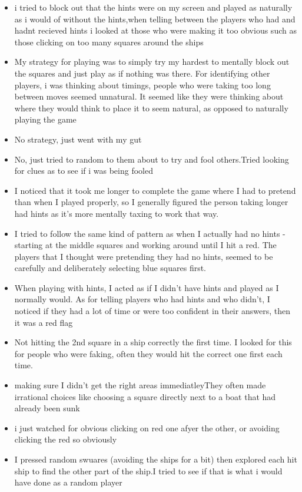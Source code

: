 \documentclass[
  english,
  man]{apa6}
\begin{document}
\begin{itemize}
\item
  i tried to block out that the hints were on my screen and played as naturally as i would of without the hints,when telling between the players who had and hadnt recieved hints i looked at those who were making it too obvious such as those clicking on too many squares around the ships
\item
  My strategy for playing was to simply try my hardest to mentally block out the squares and just play as if nothing was there. For identifying other players, i was thinking about timings, people who were taking too long between moves seemed unnatural. It seemed like they were thinking about where they would think to place it to seem natural, as opposed to naturally playing the game
\item
  No strategy, just went with my gut
\item
  No, just tried to random to them about to try and fool others.Tried looking for clues as to see if i was being fooled
\item
  I noticed that it took me longer to complete the game where I had to pretend than when I played properly, so I generally figured the person taking longer had hints as it's more mentally taxing to work that way.
\item
  I tried to follow the same kind of pattern as when I actually had no hints - starting at the middle squares and working around until I hit a red. The players that I thought were pretending they had no hints, seemed to be carefully and deliberately selecting blue squares first.
\item
  When playing with hints, I acted as if I didn't have hints and played as I normally would. As for telling players who had hints and who didn't, I noticed if they had a lot of time or were too confident in their answers, then it was a red flag
\item
  Not hitting the 2nd square in a ship correctly the first time. I looked for this for people who were faking, often they would hit the correct one first each time.
\item
  making sure I didn't get the right areas immediatleyThey often made irrational choices like choosing a square directly next to a boat that had already been sunk
\item
  i just watched for obvious clicking on red one afyer the other, or avoiding clicking the red so obviously
\item
  I pressed random swuares (avoiding the ships for a bit) then explored each hit ship to find the other part of the ship.I tried to see if that is what i would have done as a random player

\end{itemize}
\end{document}
